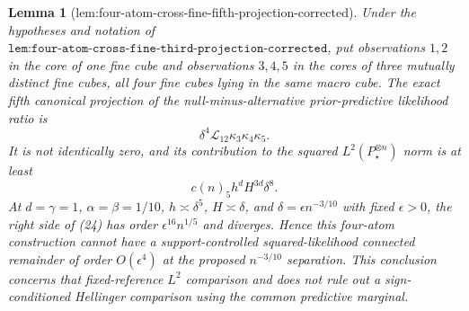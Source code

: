 \documentclass{article}
\newtheorem{lemma}{Lemma}
\begin{document}
\begin{lemma}[lem:four-atom-cross-fine-fifth-projection-corrected]\label{lem:four-atom-cross-fine-fifth-projection-corrected}
Under the hypotheses and notation of \(\texttt{lem:four-atom-cross-fine-third-projection-corrected}\), put observations \(1,2\) in the core of one fine cube and observations \(3,4,5\) in the cores of three mutually distinct fine cubes, all four fine cubes lying in the same macro cube.  The exact fifth canonical projection of the null-minus-alternative prior-predictive likelihood ratio is
\[
 \delta^4\mathcal L_{12}\kappa_3\kappa_4\kappa_5.
 \tag{23}
\]
It is not identically zero, and its contribution to the squared \(L^2(P_\star^{\otimes n})\) norm is at least
\[
 c(n)_5h^dH^{3d}\delta^8.
 \tag{24}
\]
At \(d=\gamma=1\), \(\alpha=\beta=1/10\), \(h\asymp\delta^5\), \(H\asymp\delta\), and \(\delta=\epsilon n^{-3/10}\) with fixed \(\epsilon>0\), the right side of (24) has order \(\epsilon^{16}n^{1/5}\) and diverges.  Hence this four-atom construction cannot have a support-controlled squared-likelihood connected remainder of order \(O(\epsilon^4)\) at the proposed \(n^{-3/10}\) separation.  This conclusion concerns that fixed-reference \(L^2\) comparison and does not rule out a sign-conditioned Hellinger comparison using the common predictive marginal.
\end{lemma}
\end{document}
